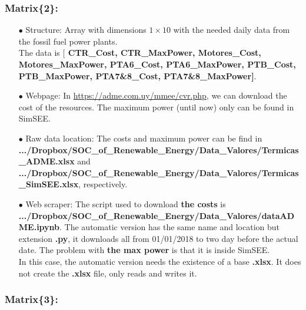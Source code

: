 \documentclass[12pt]{article}
\theoremstyle{definition}
\theoremstyle{remark}
\begin{document}
\subsubsection{Matrix\{2\}:}

\begin{enumerate}

\item[$\bullet$] Structure: Array with dimensions $1\times10$ with the needed daily data from the fossil fuel power plants.\\
The data is [\textbf{{\color{blue} CTR\_Cost, CTR\_MaxPower, Motores\_Cost, Motores\_MaxPower, PTA6\_Cost, PTA6\_MaxPower, PTB\_Cost, PTB\_MaxPower, PTA7\&8\_Cost, PTA7\&8\_MaxPower}]}.
\item[$\bullet$] Webpage: In {\color{blue} \url{https://adme.com.uy/mmee/cvr.php}}, we can download the cost of the resources. The maximum power (until now) only can be found in SimSEE.

\item[$\bullet$] Raw data location: The costs and maximum power can be find in \textbf{.../Dropbox/SOC\_of\_Renewable\_Energy/Data\_Valores/Termicas\_ADME.xlsx} and \textbf{.../Dropbox/SOC\_of\_Renewable\_Energy/Data\_Valores/Termicas\_SimSEE.xlsx}, respectively.

\item[$\bullet$] Web scraper: The script used to download \textbf{the costs} is \textbf{.../Dropbox/SOC\_of\_Renewable\_Energy/Data\_Valores/dataADME.ipynb}. The automatic version has the same name and location but extension \textbf{.py}, it downloads all from 01/01/2018 to two day before the actual date. {\color{red} The problem with \textbf{the max power} is that it is inside SimSEE}.\\
In this case, the automatic version needs the existence of a base \textbf{.xlsx}. It does not create the \textbf{.xlsx} file, only reads and writes it.

\end{enumerate}

\subsubsection{Matrix\{3\}:}
\end{document}

